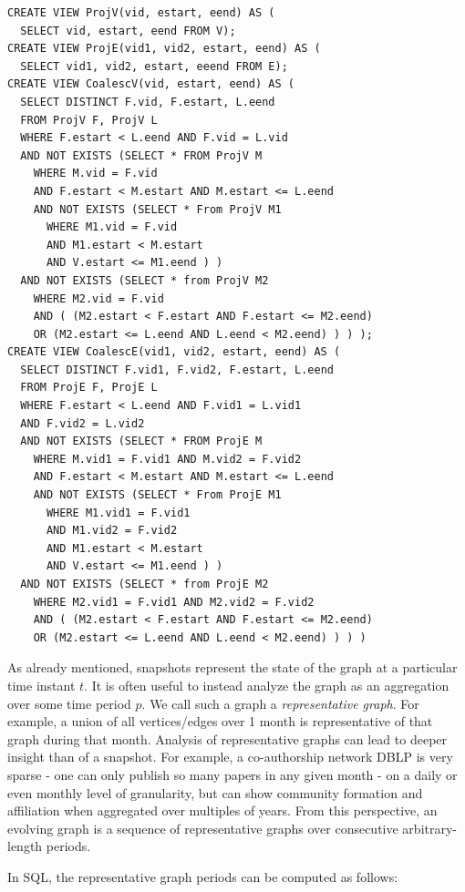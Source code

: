 \begin{small}
\begin{verbatim}
CREATE VIEW ProjV(vid, estart, eend) AS (
  SELECT vid, estart, eend FROM V);
CREATE VIEW ProjE(vid1, vid2, estart, eend) AS (
  SELECT vid1, vid2, estart, eeend FROM E);
CREATE VIEW CoalescV(vid, estart, eend) AS (
  SELECT DISTINCT F.vid, F.estart, L.eend
  FROM ProjV F, ProjV L
  WHERE F.estart < L.eend AND F.vid = L.vid
  AND NOT EXISTS (SELECT * FROM ProjV M
    WHERE M.vid = F.vid
    AND F.estart < M.estart AND M.estart <= L.eend
    AND NOT EXISTS (SELECT * From ProjV M1
      WHERE M1.vid = F.vid
      AND M1.estart < M.estart
      AND V.estart <= M1.eend ) )
  AND NOT EXISTS (SELECT * from ProjV M2
    WHERE M2.vid = F.vid
    AND ( (M2.estart < F.estart AND F.estart <= M2.eend)
    OR (M2.estart <= L.eend AND L.eend < M2.eend) ) ) );
CREATE VIEW CoalescE(vid1, vid2, estart, eend) AS (
  SELECT DISTINCT F.vid1, F.vid2, F.estart, L.eend
  FROM ProjE F, ProjE L
  WHERE F.estart < L.eend AND F.vid1 = L.vid1 
  AND F.vid2 = L.vid2
  AND NOT EXISTS (SELECT * FROM ProjE M
    WHERE M.vid1 = F.vid1 AND M.vid2 = F.vid2
    AND F.estart < M.estart AND M.estart <= L.eend
    AND NOT EXISTS (SELECT * From ProjE M1
      WHERE M1.vid1 = F.vid1
      AND M1.vid2 = F.vid2
      AND M1.estart < M.estart
      AND V.estart <= M1.eend ) )
  AND NOT EXISTS (SELECT * from ProjE M2
    WHERE M2.vid1 = F.vid1 AND M2.vid2 = F.vid2
    AND ( (M2.estart < F.estart AND F.estart <= M2.eend)
    OR (M2.estart <= L.eend AND L.eend < M2.eend) ) ) )
\end{verbatim}
\end{small}

As already mentioned, snapshots represent the state of the graph at a
particular time instant $t$.  It is often useful to instead analyze
the graph as an aggregation over some time period $p$.  We call such a
graph a {\em representative graph}.  For example, a union of all
vertices/edges over 1 month is representative of that graph during
that month.  Analysis of representative graphs can lead to deeper
insight than of a snapshot.  For example, a co-authorship network DBLP
is very sparse - one can only publish so many papers in any given
month - on a daily or even monthly level of granularity, but can show
community formation and affiliation when aggregated over multiples of
years.  From this perspective, an evolving graph is a sequence of
representative graphs over consecutive arbitrary-length periods.

In SQL, the representative graph periods can be computed as follows:

